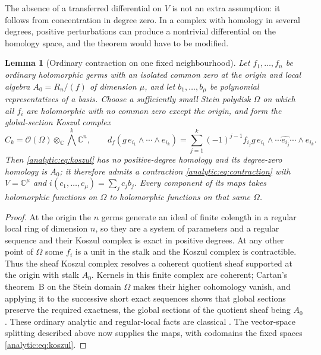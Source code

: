 \documentclass[11pt,letterpaper]{article}
\newtheorem{lemma}[theorem]{Lemma}
\theoremstyle{definition}
\theoremstyle{remark}
\newcommand{\C}{\mathbb C}
\newcommand{\OO}{\mathcal O}
\numberwithin{equation}{section}
\begin{document}
The absence of a transferred differential on $V$ is not an extra
assumption: it follows from concentration in degree zero. In a complex with
homology in several degrees, positive perturbations can produce a
nontrivial differential on the homology space, and the theorem would have to
be modified.

\begin{lemma}[Ordinary contraction on one fixed neighbourhood]
\label{analytic:lem:ordinarykoszul}
Let $f_1,\ldots,f_n$ be ordinary holomorphic germs with an isolated common
zero at the origin and local algebra $A_0=R_n/(f)$ of dimension $\mu$, and
let $b_1,\ldots,b_\mu$ be polynomial representatives of a basis. Choose a
sufficiently small Stein polydisk $\Omega$ on which all $f_i$ are
holomorphic with no common zero except the origin, and form the
global-section Koszul complex
\begin{equation}\label{analytic:eq:koszul}
 C_k=\OO(\Omega)\otimes_\C\textstyle\bigwedge^k\C^n,\qquad
 d_f(g\,e_{i_1}\wedge\cdots\wedge e_{i_k})
 =\sum_{j=1}^k(-1)^{j-1}f_{i_j}g\,
 e_{i_1}\wedge\cdots\widehat{e_{i_j}}\cdots\wedge e_{i_k}.
\end{equation}
Then \eqref{analytic:eq:koszul} has no positive-degree homology and its
degree-zero homology is $A_0$; it therefore admits a contraction
\eqref{analytic:eq:contraction} with $V=\C^\mu$ and
$i(c_1,\ldots,c_\mu)=\sum_jc_jb_j$. Every component of its maps takes
holomorphic functions on $\Omega$ to holomorphic functions on that same
$\Omega$.
\end{lemma}
\begin{proof}
At the origin the $n$ germs generate an ideal of finite colength in a
regular local ring of dimension $n$, so they are a system of parameters and
a regular sequence and their Koszul complex is exact in positive degrees. At
any other point of $\Omega$ some $f_i$ is a unit in the stalk and the Koszul
complex is contractible. Thus the sheaf Koszul complex resolves a coherent
quotient sheaf supported at the origin with stalk $A_0$. Kernels in this
finite complex are coherent; Cartan's theorem~B on the Stein domain
$\Omega$ makes their higher cohomology vanish, and applying it to the
successive short exact sequences shows that global sections preserve the
required exactness, the global sections of the quotient sheaf being $A_0$.
These ordinary analytic and regular-local facts are classical
\cite{GunningRossi,GrauertRemmert,Stacks}. The vector-space splitting
described above now supplies the maps, with codomains the fixed spaces
\eqref{analytic:eq:koszul}.
\end{proof}
\end{document}

